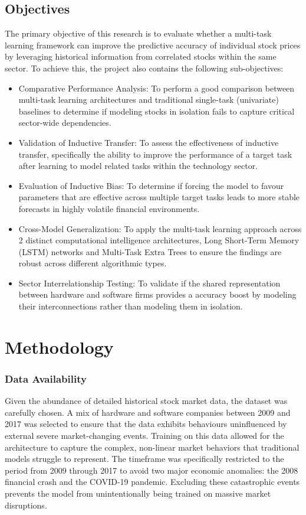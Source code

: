 \documentclass[conference]{IEEEtran}
\begin{document}
\subsection*{Objectives}
The primary objective of this research is to evaluate whether a multi-task learning framework 
can improve the predictive accuracy of individual stock prices by leveraging historical information 
from correlated stocks within the same sector. To achieve this, the project also contains the following 
sub-objectives:
\begin{itemize}
\item Comparative Performance Analysis: To perform a good comparison between multi-task learning architectures 
    and traditional single-task (univariate) baselines to determine if modeling stocks in isolation fails 
    to capture critical sector-wide dependencies.
\item Validation of Inductive Transfer: To assess the effectiveness of inductive transfer, specifically 
    the ability to improve the performance of a target task after learning to model related tasks within 
    the technology sector.
\item Evaluation of Inductive Bias: To determine if forcing the model to favour parameters that are 
    effective across multiple target tasks leads to more stable forecasts in highly volatile financial 
    environments.
\item Cross-Model Generalization: To apply the multi-task learning approach across 2 distinct computational 
    intelligence architectures, Long Short-Term Memory (LSTM) networks and Multi-Task Extra Trees to ensure 
    the findings are robust across different algorithmic types.
\item Sector Interrelationship Testing: To validate if the shared representation between hardware and software 
    firms provides a accuracy boost by modeling their interconnections rather than modeling them in 
    isolation.
\end{itemize}
\section{Methodology}
\subsubsection*{Data Availability}
Given the abundance of detailed historical stock market data, the dataset was carefully chosen.
A mix of hardware and software companies between 2009 and 2017 was selected to ensure that the
data exhibits behaviours uninfluenced by external severe market-changing events. Training on 
this data allowed for the architecture to capture the complex, non-linear market behaviors that
traditional models struggle to represent. The timeframe was specifically restricted to the period
from 2009 through 2017 to avoid two major economic anomalies: the 2008 financial crash and the 
COVID-19 pandemic. Excluding these catastrophic events prevents the model from unintentionally
being trained on massive market disruptions.
\end{document}
